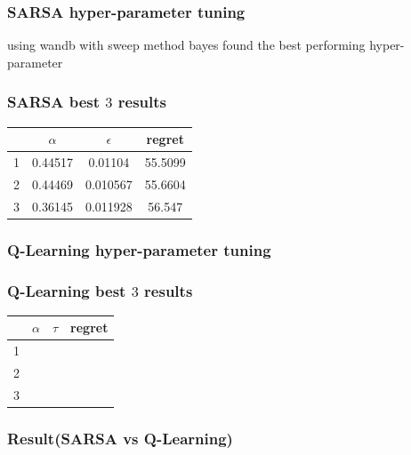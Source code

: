 \documentclass[11pt, a4]{article}
\begin{document}
			\subsubsection{SARSA  hyper-parameter tuning}
				using wandb with sweep method bayes found the best performing hyper-parameter 
			\subsubsection{SARSA best $3$ results}
				\begin{center}
					\begin{tabular}{|c|c|c|c|}
						\hline
						 & $\alpha$ & $\epsilon$ & regret\\
						\hline
						1 & 0.44517 & 0.01104 & 55.5099\\
						\hline
						2 & 0.44469 & 0.010567 & 55.6604 \\
						\hline
						3 & 0.36145 & 0.011928 & 56.547\\
						\hline
					\end{tabular}
				\end{center}

			\subsubsection{Q-Learning hyper-parameter tuning}
			\subsubsection{Q-Learning best $3$ results}
				\begin{center}
					\begin{tabular}{|c|c|c|c|}
						\hline
						& $\alpha$ & $\tau$ & regret\\
						\hline
						1 &  & &\\
						\hline
						2 & & &\\
						\hline
						3 & & &\\
						\hline
					\end{tabular}
				\end{center}
			\subsubsection{Result(SARSA vs Q-Learning)}
\end{document}
